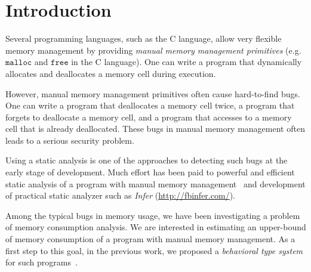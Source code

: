 \section{Introduction}
\label{sec:introduction}

Several programming languages, such as the C language, allow very
flexible memory management by providing \emph{manual memory management
primitives} (e.g. \(\mathtt{malloc}\) and \(\mathtt{free}\) in the C
language).  One can write a program that dynamically allocates and
deallocates a memory cell during execution.

However, manual memory management primitives often cause hard-to-find
bugs.  One can write a program that deallocates a memory cell twice, a
program that forgets to deallocate a memory cell, and a program that
accesses to a memory cell that is already deallocated.  These bugs in
manual memory management often leads to a serious security problem.

Using a static analysis is one of the approaches to detecting such bugs
at the early stage of development.  Much effort has been paid to
powerful and efficient static analysis of a program with manual memory
management~\cite{DBLP:conf/aplas/SuenagaK09,DBLP:conf/pldi/HeineL03,DBLP:conf/sigsoft/XieA05,DBLP:journals/scp/SwamyHMGJ06,DBLP:conf/sas/OrlovichR06,DBLP:conf/issta/SuiYX12}
and development of practical static analyzer such as \emph{Infer}
(\url{http://fbinfer.com/}).

Among the typical bugs in memory usage, we have been investigating a
problem of memory consumption analysis.  We are interested in estimating
an upper-bound of memory consumption of a program with manual memory
management.  As a first step to this goal, in the previous work, we
proposed a \emph{behavioral type system} for such
programs~\cite{tanPPL2014}.


